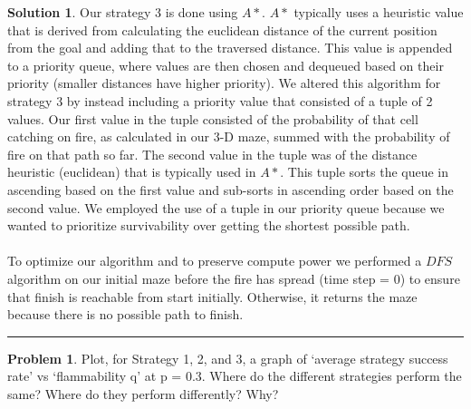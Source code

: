 \documentclass{article}
\theoremstyle{definition}
\newtheorem{problem}{Problem}
\def\fline{\rule{0.75\linewidth}{0.5pt}}
\newcommand{\finishline}{\vspace{-15pt}\begin{center}\fline\end{center}}
\newtheorem*{solution*}{Solution}
\newenvironment{solution}{\begin{solution*}}{{\finishline} \end{solution*}}
\begin{document}
\begin{solution}
	Our strategy 3 is done using $A*$. $A*$ typically uses a heuristic value that is derived from calculating the euclidean distance of the current position from the goal and adding that to the traversed distance. This value is appended to a priority queue, where values are then chosen and dequeued based on their priority (smaller distances have higher priority). We altered this algorithm for strategy 3 by instead including a priority value that consisted of a tuple of 2 values. Our first value in the tuple consisted of the probability of that cell catching on fire, as calculated in our 3-D maze, summed with the probability of fire on that path so far. The second value in the tuple was of the distance heuristic (euclidean) that is typically used in $A*$. This tuple sorts the queue in ascending based on the first value and sub-sorts in ascending order based on the second value. We employed the use of a tuple in our priority queue because we wanted to prioritize survivability over getting the shortest possible path. 
	\\\\
	To optimize our algorithm and to preserve compute power we performed a $DFS$ algorithm on our initial maze before the fire has spread (time step = 0) to ensure that finish is reachable from start initially. Otherwise, it returns the maze because there is no possible path to finish.
	
\end{solution}

\smallskip

\begin{problem}
	Plot, for Strategy 1, 2, and 3, a graph of `average strategy success rate' vs `flammability q' at p = 0.3. Where do the different strategies perform the same? Where do they perform differently? Why?
\end{problem}

\smallskip
\end{document}
